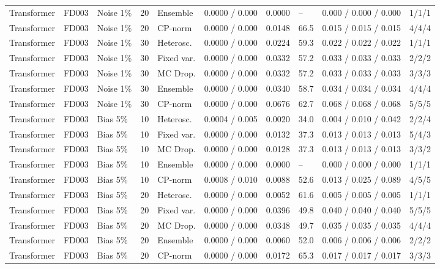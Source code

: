 \documentclass[10pt,a4paper]{article}
\begin{document}
\begin{landscape}
\begin{center}
\begin{longtable}{lllllcclll}
Transformer & FD003 & Noise 1\% & 20 & Ensemble & 0.0000 / 0.000 & 0.0000 & -- & 0.000 / 0.000 / 0.000 & 1/1/1 \\
Transformer & FD003 & Noise 1\% & 20 & CP-norm & 0.0000 / 0.000 & 0.0148 & 66.5 & 0.015 / 0.015 / 0.015 & 4/4/4 \\
Transformer & FD003 & Noise 1\% & 30 & Heterosc. & 0.0000 / 0.000 & 0.0224 & 59.3 & 0.022 / 0.022 / 0.022 & 1/1/1 \\
Transformer & FD003 & Noise 1\% & 30 & Fixed var. & 0.0000 / 0.000 & 0.0332 & 57.2 & 0.033 / 0.033 / 0.033 & 2/2/2 \\
Transformer & FD003 & Noise 1\% & 30 & MC Drop. & 0.0000 / 0.000 & 0.0332 & 57.2 & 0.033 / 0.033 / 0.033 & 3/3/3 \\
Transformer & FD003 & Noise 1\% & 30 & Ensemble & 0.0000 / 0.000 & 0.0340 & 58.7 & 0.034 / 0.034 / 0.034 & 4/4/4 \\
Transformer & FD003 & Noise 1\% & 30 & CP-norm & 0.0000 / 0.000 & 0.0676 & 62.7 & 0.068 / 0.068 / 0.068 & 5/5/5 \\
Transformer & FD003 & Bias 5\% & 10 & Heterosc. & 0.0004 / 0.005 & 0.0020 & 34.0 & 0.004 / 0.010 / 0.042 & 2/2/4 \\
Transformer & FD003 & Bias 5\% & 10 & Fixed var. & 0.0000 / 0.000 & 0.0132 & 37.3 & 0.013 / 0.013 / 0.013 & 5/4/3 \\
Transformer & FD003 & Bias 5\% & 10 & MC Drop. & 0.0000 / 0.000 & 0.0128 & 37.3 & 0.013 / 0.013 / 0.013 & 3/3/2 \\
Transformer & FD003 & Bias 5\% & 10 & Ensemble & 0.0000 / 0.000 & 0.0000 & -- & 0.000 / 0.000 / 0.000 & 1/1/1 \\
Transformer & FD003 & Bias 5\% & 10 & CP-norm & 0.0008 / 0.010 & 0.0088 & 52.6 & 0.013 / 0.025 / 0.089 & 4/5/5 \\
Transformer & FD003 & Bias 5\% & 20 & Heterosc. & 0.0000 / 0.000 & 0.0052 & 61.6 & 0.005 / 0.005 / 0.005 & 1/1/1 \\
Transformer & FD003 & Bias 5\% & 20 & Fixed var. & 0.0000 / 0.000 & 0.0396 & 49.8 & 0.040 / 0.040 / 0.040 & 5/5/5 \\
Transformer & FD003 & Bias 5\% & 20 & MC Drop. & 0.0000 / 0.000 & 0.0348 & 49.7 & 0.035 / 0.035 / 0.035 & 4/4/4 \\
Transformer & FD003 & Bias 5\% & 20 & Ensemble & 0.0000 / 0.000 & 0.0060 & 52.0 & 0.006 / 0.006 / 0.006 & 2/2/2 \\
Transformer & FD003 & Bias 5\% & 20 & CP-norm & 0.0000 / 0.000 & 0.0172 & 65.3 & 0.017 / 0.017 / 0.017 & 3/3/3 \\

\end{longtable}
\end{center}
\end{landscape}
\end{document}

